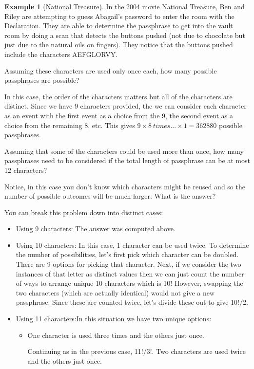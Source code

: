 \documentclass[10pt,]{book}
\theoremstyle{plain}
\theoremstyle{definition}
\theoremstyle{definition}
\newtheorem{example}[theorem]{Example}
\theoremstyle{definition}
\numberwithin{equation}{section}
\begin{document}
\begin{example}[National Treasure]\label{example-8}
In the 2004 movie National Treasure, Ben and Riley are attempting 
		to guess Abagail's password to enter the room with the Declaration. 
		They are able
		to determine the passphrase to get into the vault room by doing a scan
		that detects the buttons pushed (not due to chocolate but just due to 
		the natural oils on fingers). They notice that the buttons pushed 
		include the characters AEFGLORVY.%
\par
Assuming these characters are used only once each, how many possible
		passphrases are possible?%
\par

		In this case, the order of the characters matters but all of the 
		characters are distinct. Since we have 9 characters provided, the we can
		consider each character as an event with the first event as a choice
		from the 9, the second event as a choice from the remaining 8, etc. This
		gives \(9 \times 8 \ times ... \times 1 = 362880\) possible 
		passphrases.
\par
Assuming that some of the characters could be used more than once, 
		how many passphrases need to be considered if the total length
		of passphrase can be at most 12 characters?%
\par
Notice, in this case you don't know which characters might be reused and so the number of possible outcomes will be much larger. What is the answer?%
\par
You can break this problem down into distinct cases:
		\leavevmode%
\begin{itemize}[label=\textbullet]
\item{}Using 9 characters: The answer was computed above.%
\item{}Using 10 characters: In this case, 1 character can be used twice. To determine the number of possibilities, let's first pick which character can be doubled. There are 9 options for picking that character.  Next, if we consider the two instances of that letter as distinct values then we can just count the number of ways to arrange unique 10 characters which is 10! However, swapping the two characters (which are actually identical) would not give a new passphrase. Since these are counted twice, let's divide these out to give 10!/2.%
\item{}Using 11 characters:In this situation we have two unique options:
\begin{itemize}[label=$\circ$]
\item{}One character is used three times and the others just once.%
\par
Continuing as in the previous case, 11!/3!.%
Two characters are used twice and the others just once.\end{itemize}


\end{itemize}
\end{example}
\end{document}
